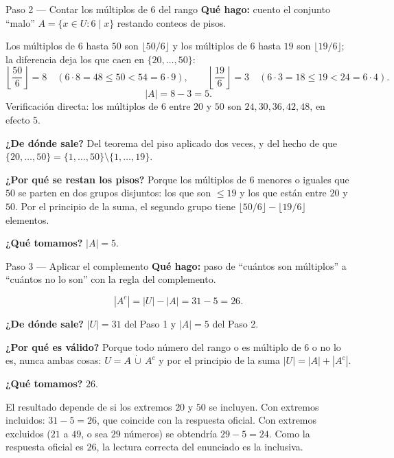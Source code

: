 \documentclass[11pt]{article}
\begin{document}
\begin{paso}{Paso 2 --- Contar los múltiplos de 6 del rango}
\textbf{Qué hago:} cuento el conjunto ``malo'' $A=\{x\in U: 6\mid x\}$ restando conteos de pisos.

Los múltiplos de $6$ hasta $50$ son $\lfloor 50/6\rfloor$ y los múltiplos de $6$ hasta $19$ son $\lfloor 19/6\rfloor$; la diferencia deja los que caen en $\{20,\dots,50\}$:
\[
\left\lfloor \frac{50}{6} \right\rfloor = 8 \quad (6\cdot 8 = 48\le 50 < 54 = 6\cdot 9), \qquad
\left\lfloor \frac{19}{6} \right\rfloor = 3 \quad (6\cdot 3 = 18\le 19 < 24 = 6\cdot 4).
\]
\[
|A| = 8-3 = 5 .
\]
Verificación directa: los múltiplos de $6$ entre $20$ y $50$ son $24,30,36,42,48$, en efecto $5$.

\textbf{¿De dónde sale?} Del teorema del piso aplicado dos veces, y del hecho de que $\{20,\dots,50\} = \{1,\dots,50\}\setminus\{1,\dots,19\}$.

\textbf{¿Por qué se restan los pisos?} Porque los múltiplos de $6$ menores o iguales que $50$ se parten en dos grupos disjuntos: los que son $\le 19$ y los que están entre $20$ y $50$. Por el principio de la suma, el segundo grupo tiene $\lfloor 50/6\rfloor - \lfloor 19/6\rfloor$ elementos.

\textbf{¿Qué tomamos?} $|A| = 5$.
\end{paso}

\begin{paso}{Paso 3 --- Aplicar el complemento}
\textbf{Qué hago:} paso de ``cuántos son múltiplos'' a ``cuántos no lo son'' con la regla del complemento.

\[
|A^{c}| = |U| - |A| = 31 - 5 = 26 .
\]

\textbf{¿De dónde sale?} $|U|=31$ del Paso 1 y $|A|=5$ del Paso 2.

\textbf{¿Por qué es válido?} Porque todo número del rango o es múltiplo de $6$ o no lo es, nunca ambas cosas: $U = A\,\dot\cup\,A^c$ y por el principio de la suma $|U|=|A|+|A^c|$.

\textbf{¿Qué tomamos?} $26$.
\end{paso}

\begin{nota}
El resultado depende de si los extremos $20$ y $50$ se incluyen. Con extremos incluidos: $31-5=26$, que coincide con la respuesta oficial. Con extremos excluidos ($21$ a $49$, o sea $29$ números) se obtendría $29-5=24$. Como la respuesta oficial es $26$, la lectura correcta del enunciado es la inclusiva.
\end{nota}
\end{document}
